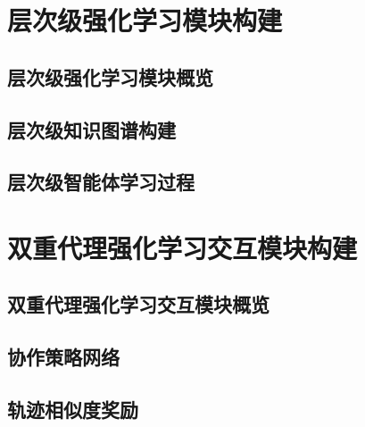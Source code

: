 \documentclass[algorithmlist, AutoFakeBold, AutoFakeSlant, figurelist, tablelist, nomlist, masters]{seuthesix}
\begin{document}
\section{层次级强化学习模块构建}

\subsection{层次级强化学习模块概览}


\subsection{层次级知识图谱构建}


\subsection{层次级智能体学习过程}


\section{双重代理强化学习交互模块构建}


\subsection{双重代理强化学习交互模块概览}

\subsection{协作策略网络}


\subsection{轨迹相似度奖励}
\end{document}
